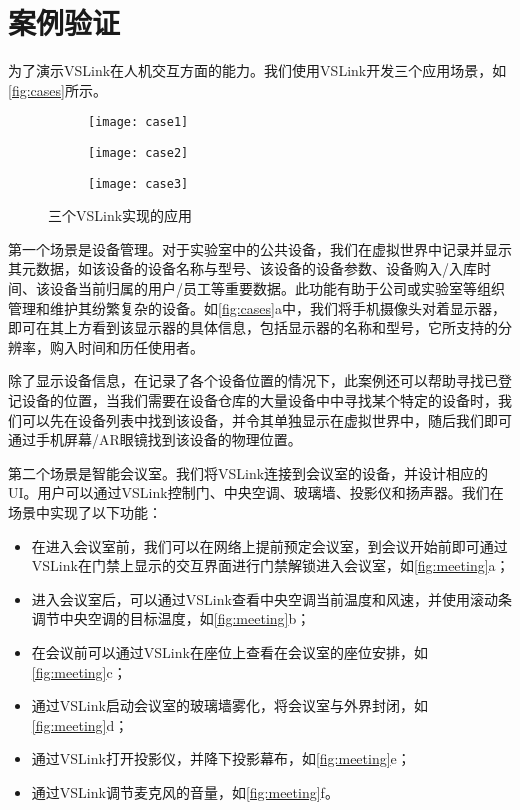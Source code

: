 \section{案例验证}
为了演示VSLink在人机交互方面的能力。我们使用VSLink开发三个应用场景，如\autoref{fig:cases}所示。

\begin{figure}[htbp]
	\centering
	\begin{subfigure}{.65\linewidth}
		\texttt{[image: case1]}
		\caption{}
	\end{subfigure}
	\begin{subfigure}{.65\linewidth}
		\texttt{[image: case2]}
		\caption{}
	\end{subfigure}
	\begin{subfigure}{.65\linewidth}
		\texttt{[image: case3]}
		\caption{}
	\end{subfigure}
	\caption{三个VSLink实现的应用}\label{fig:cases}
\end{figure}

第一个场景是设备管理。对于实验室中的公共设备，我们在虚拟世界中记录并显示其元数据，如该设备的设备名称与型号、该设备的设备参数、设备购入/入库时间、该设备当前归属的用户/员工等重要数据。此功能有助于公司或实验室等组织管理和维护其纷繁复杂的设备。如\autoref{fig:cases}a中，我们将手机摄像头对着显示器，即可在其上方看到该显示器的具体信息，包括显示器的名称和型号，它所支持的分辨率，购入时间和历任使用者。

除了显示设备信息，在记录了各个设备位置的情况下，此案例还可以帮助寻找已登记设备的位置，当我们需要在设备仓库的大量设备中中寻找某个特定的设备时，我们可以先在设备列表中找到该设备，并令其单独显示在虚拟世界中，随后我们即可通过手机屏幕/AR眼镜找到该设备的物理位置。

第二个场景是智能会议室。我们将VSLink连接到会议室的设备，并设计相应的UI。用户可以通过VSLink控制门、中央空调、玻璃墙、投影仪和扬声器。我们在场景中实现了以下功能：
\begin{itemize}
	\item 在进入会议室前，我们可以在网络上提前预定会议室，到会议开始前即可通过VSLink在门禁上显示的交互界面进行门禁解锁进入会议室，如\autoref{fig:meeting}a；
	\item 进入会议室后，可以通过VSLink查看中央空调当前温度和风速，并使用滚动条调节中央空调的目标温度，如\autoref{fig:meeting}b；
	\item 在会议前可以通过VSLink在座位上查看在会议室的座位安排，如\autoref{fig:meeting}c；
	\item 通过VSLink启动会议室的玻璃墙雾化，将会议室与外界封闭，如\autoref{fig:meeting}d；
	\item 通过VSLink打开投影仪，并降下投影幕布，如\autoref{fig:meeting}e；
	\item 通过VSLink调节麦克风的音量，如\autoref{fig:meeting}f。
\end{itemize}

